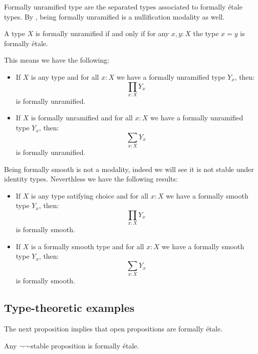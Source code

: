 Formally unramified type are the separated types \cite[Definition 2.13]{localization} associated to formally étale types.
By \cite[Lemma 2.15]{localization}, being formally unramified is a nullification modality as well.

\begin{lemma}
A type $X$ is formally unramified if and only if for any $x,y:X$ the type $x=y$ is formally étale.
\end{lemma}

This means we have the following:

\begin{proposition}
\begin{itemize}
\item If $X$ is any type and for all $x:X$ we have a formally unramified type $Y_x$, then:
\[\prod_{x:X}Y_x\]
is formally unramified. 
\item  If $X$ is formally unramified and for all $x:X$ we have a formally unramified type $Y_x$, then:
\[\sum_{x:X}Y_x\]
is formally unramified.
\end{itemize}
\end{proposition}

Being formally smooth is not a modality, indeed we will see it is not stable under identity types. Neverthless we have the following results:

\begin{lemma}\label{smooth-sigma-closed}
\begin{itemize}
\item If $X$ is any type satifying choice and for all $x:X$ we have a formally smooth type $Y_x$, then:
\[\prod_{x:X}Y_x\]
is formally smooth.
\item If $X$ is a formally smooth type and for all $x:X$ we have a formally smooth type $Y_x$, then:
\[\sum_{x:X}Y_x\]
is formally smooth.
\end{itemize}
\end{lemma}


\subsection{Type-theoretic examples}

The next proposition implies that open propositions are formally étale.

\begin{lemma}\label{not-not-stable-prop-etale}
  Any $\neg\neg$-stable proposition is formally étale.
\end{lemma}

